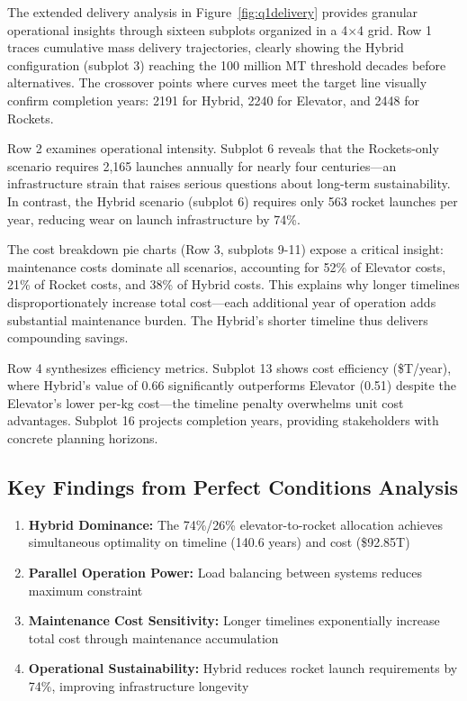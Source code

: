 \documentclass[12pt]{article}
\begin{document}
	The extended delivery analysis in Figure~\ref{fig:q1delivery} provides granular operational insights through sixteen subplots organized in a 4$\times$4 grid. Row 1 traces cumulative mass delivery trajectories, clearly showing the Hybrid configuration (subplot 3) reaching the 100 million MT threshold decades before alternatives. The crossover points where curves meet the target line visually confirm completion years: 2191 for Hybrid, 2240 for Elevator, and 2448 for Rockets.
	
	Row 2 examines operational intensity. Subplot 6 reveals that the Rockets-only scenario requires 2,165 launches annually for nearly four centuries---an infrastructure strain that raises serious questions about long-term sustainability. In contrast, the Hybrid scenario (subplot 6) requires only 563 rocket launches per year, reducing wear on launch infrastructure by 74\%.
	
	The cost breakdown pie charts (Row 3, subplots 9-11) expose a critical insight: maintenance costs dominate all scenarios, accounting for 52\% of Elevator costs, 21\% of Rocket costs, and 38\% of Hybrid costs. This explains why longer timelines disproportionately increase total cost---each additional year of operation adds substantial maintenance burden. The Hybrid's shorter timeline thus delivers compounding savings.
	
	Row 4 synthesizes efficiency metrics. Subplot 13 shows cost efficiency (\$T/year), where Hybrid's value of 0.66 significantly outperforms Elevator (0.51) despite the Elevator's lower per-kg cost---the timeline penalty overwhelms unit cost advantages. Subplot 16 projects completion years, providing stakeholders with concrete planning horizons.
	
	\subsection{Key Findings from Perfect Conditions Analysis}
	
	\begin{enumerate}[leftmargin=2em]
		\item \textbf{Hybrid Dominance:} The 74\%/26\% elevator-to-rocket allocation achieves simultaneous optimality on timeline (140.6 years) and cost (\$92.85T)
		\item \textbf{Parallel Operation Power:} Load balancing between systems reduces maximum constraint
		\item \textbf{Maintenance Cost Sensitivity:} Longer timelines exponentially increase total cost through maintenance accumulation
		\item \textbf{Operational Sustainability:} Hybrid reduces rocket launch requirements by 74\%, improving infrastructure longevity
	\end{enumerate}
	
\end{document}

